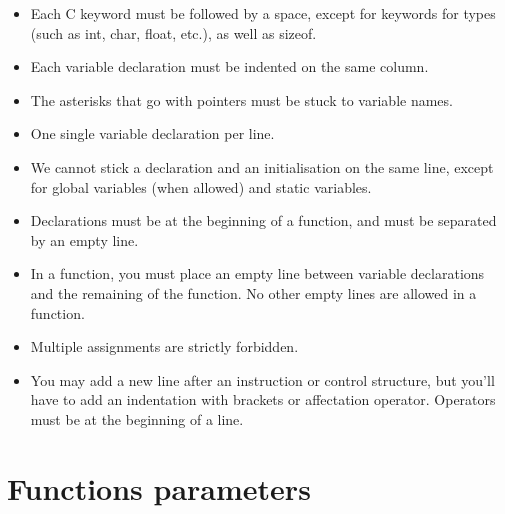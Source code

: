 \documentclass{42-en}
\begin{document}
\begin{itemize}
      			\item Each C keyword must be followed by a space, except for
                  keywords for types (such as int, char, float, etc.),
                  as well as sizeof.

      			\item Each variable declaration must be indented on the same
                  column.

      			\item The asterisks that go with pointers must be stuck to
                  variable names.

    		    \item One single variable declaration per line.

      		    \item We cannot stick a declaration and an initialisation
                  on the same line, except for global variables (when allowed) and
                  static variables.

			    \item Declarations must be at the beginning of a function,
                  and must be separated by an empty line.

                \item In a function, you must place an empty line between 
                    variable declarations and the remaining of the function.
                    No other empty lines are allowed in a function.

                \item Multiple assignments are strictly forbidden.

                \item You may add a new line after an instruction or
                  control structure, but you'll have to add an
                  indentation with brackets or affectation operator.
                  Operators must be at the beginning of a line.

            \end{itemize}


    \section{Functions parameters}
\end{document}
